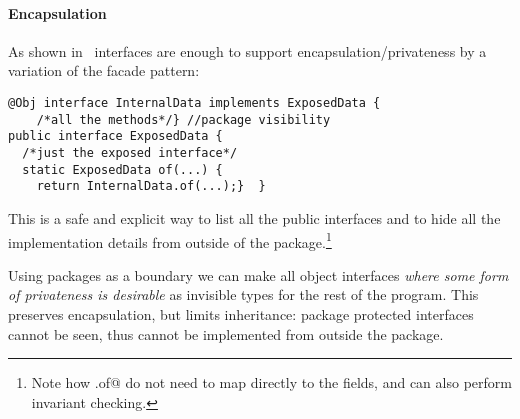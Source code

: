 \begin{comment}
@Obj interface Person$ extends Person{//will be further expanded by @Obj
  void name(String val);
  default void rename(String newName){ if(/*valid name*/){ this.name(val);}}
  String name();
  static Person from(String val){ if(/*valid name*/){return Person$.of(val);}
    throw /*invalid name*/}  }
\end{lstlisting}

This is not a perfect solution, since
\Q@Person$@ can still be seen inside the \Q@Person@ package and heirs of
\Q@Person$@,
however it is surprising we achieve such of a good result without any language
support for privacy in interfaces.
\end{comment}

\paragraph{Encapsulation} %

As shown in~\cite{BettiniDSS13} interfaces are enough to support encapsulation/privateness by a
 variation of the facade pattern:
\begin{lstlisting}
@Obj interface InternalData implements ExposedData {
    /*all the methods*/} //package visibility
public interface ExposedData {
  /*just the exposed interface*/
  static ExposedData of(...) {
    return InternalData.of(...);}  }
\end{lstlisting}

This is a safe and explicit way to list all the public interfaces and to hide all the implementation
details from outside of the package.\footnote{
Note how \Q@ExposedData.of@ do not need to map directly to the fields, and can also perform
invariant checking.}

Using packages as a boundary we can make all object interfaces \emph{where some form of privateness is desirable}
as invisible types for the rest of the program.
This preserves encapsulation, but limits inheritance:
package protected interfaces cannot be seen,
thus cannot be implemented from outside the package.

